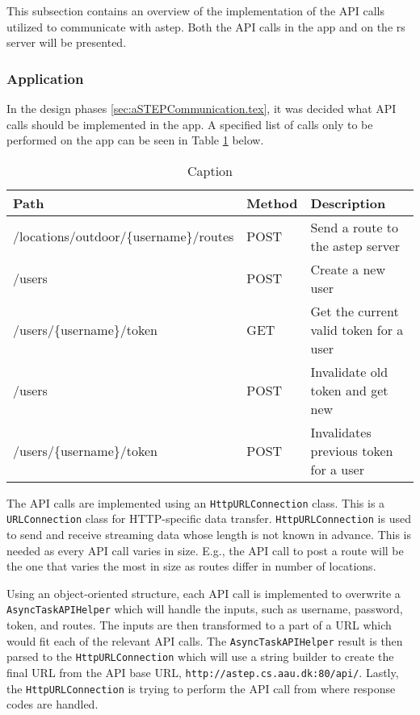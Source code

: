 This subsection contains an overview of the implementation of the API calls utilized to communicate with \gls{astep}.
Both the API calls in the app and on the \gls{rs} server will be presented.

 \subsubsection{Application}
In the design phases \ref{sec:aSTEPCommunication.tex}, it was decided what API calls should be implemented in the app.
A specified list of calls only to be performed on the app can be seen in Table \ref{tab:asteprequests} below.

\begin{table}[h]
	\centering
	\scriptsize
	\begin{tabular}{l l l}
		Path & Method & Description\\\midrule
		/locations/outdoor/\{username\}/routes & POST & Send a route to the \gls{astep} server\\
		/users & POST & Create a new user\\
		/users/\{username\}/token & GET & Get the current valid token for a user\\
		/users & POST & Invalidate old token and get new\\
		/users/\{username\}/token & POST & Invalidates previous token for a user\\
	\end{tabular}
	\caption{Caption}
	\label{tab:asteprequests}
\end{table} 

The API calls are implemented using an \texttt{HttpURLConnection} class.
This is a \texttt{URLConnection} class for HTTP-specific data transfer.
\texttt{HttpURLConnection} is used to send and receive streaming data whose length is not known in advance.
This is needed as every API call varies in size.
E.g., the API call to post a route will be the one that varies the most in size as routes differ in number of locations.


Using an object-oriented structure, each API call is implemented to overwrite a \texttt{AsyncTaskAPIHelper} which will handle the inputs, such as username, password, token, and routes.
The inputs are then transformed to a part of a URL which would fit each of the relevant API calls.
The \texttt{AsyncTaskAPIHelper} result is then parsed to the \texttt{HttpURLConnection} which will use a string builder to create the final URL from the API base URL, \texttt{http://astep.cs.aau.dk:80/api/}.
Lastly, the \texttt{HttpURLConnection} is trying to perform the API call from where response codes are handled.

